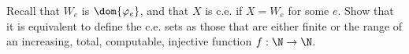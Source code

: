 \begin{problem}
  Recall that $W_e$ is $\dom{\varphi_e}$, and that $X$ is c.e. if
  $X = W_e$ for some $e$. Show that it is equivalent to define
  the c.e. sets as those that are either finite or the range
  of an increasing, total, computable, injective function
  $f : \N \to \N$.

  \begin{answer}
    
  \end{answer}
\end{problem}
